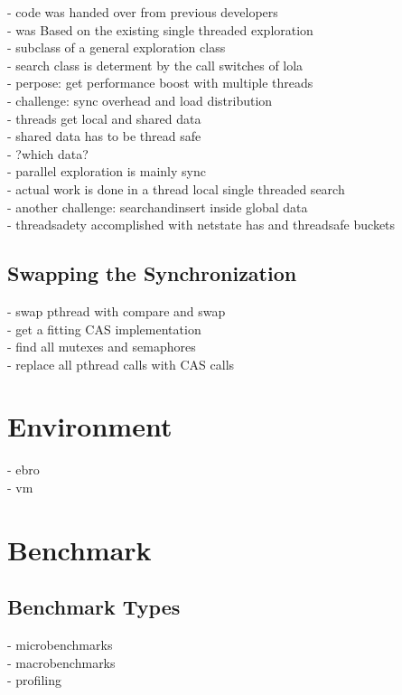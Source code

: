 - code was handed over from previous developers\\
- was Based on the existing single threaded exploration\\
- subclass of a general exploration class\\
- search class is determent by the call switches of lola\\

- perpose: get performance boost with multiple threads\\
- challenge: sync overhead and load distribution\\

- threads get local and shared data\\
- shared data has to be thread safe\\
- ?which data?\\
- parallel exploration is mainly sync\\
- actual work is done in a thread local single threaded search\\

- another challenge: searchandinsert inside global data\\
- threadsadety accomplished with netstate has and threadsafe buckets\\

\subsection{Swapping the Synchronization}
- swap pthread with compare and swap\\
- get a fitting CAS implementation\\
- find all mutexes and semaphores\\
- replace all pthread calls with CAS calls\\

\section{Environment}
- ebro\\
- vm\\

\section{Benchmark}
\subsection{Benchmark Types}
- microbenchmarks\\
- macrobenchmarks\\
- profiling\\
